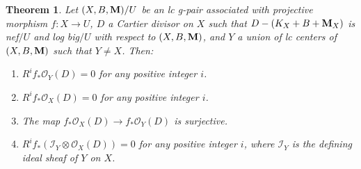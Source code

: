 \documentclass[11pt]{amsart}
\numberwithin{equation}{section}
\newcommand{\Mm}{{\bf{M}}}
\newtheorem{thm}{Theorem}[subsection]
\theoremstyle{definition}
\theoremstyle{definition}
\theoremstyle{definition}
\begin{document}
\begin{thm}\label{thm: kod vanishing with lc strata}
Let $(X,B,\Mm)/U$ be an lc g-pair associated with projective morphism $f: X\rightarrow U$, $D$ a Cartier divisor on $X$ such that $D-(K_X+B+\Mm_X)$ is nef$/U$ and log big$/U$ with respect to $(X,B,\Mm)$, and $Y$ a union of lc centers of $(X,B,\Mm)$ such that $Y\not=X$. Then:
\begin{enumerate}
	\item $R^if_*\mathcal{O}_Y(D)=0$ for any positive integer $i$.
	\item $R^if_*\mathcal{O}_X(D)=0$ for any positive integer $i$.
    \item The map $f_*\mathcal{O}_X(D)\rightarrow f_*\mathcal{O}_Y(D)$ is surjective.
    \item $R^if_*(\mathcal{I}_Y\otimes\mathcal{O}_X(D))=0$ for any positive integer $i$, where $\mathcal{I}_Y$ is the defining ideal sheaf of $Y$ on $X$.
\end{enumerate}
\end{thm}
\end{document}
